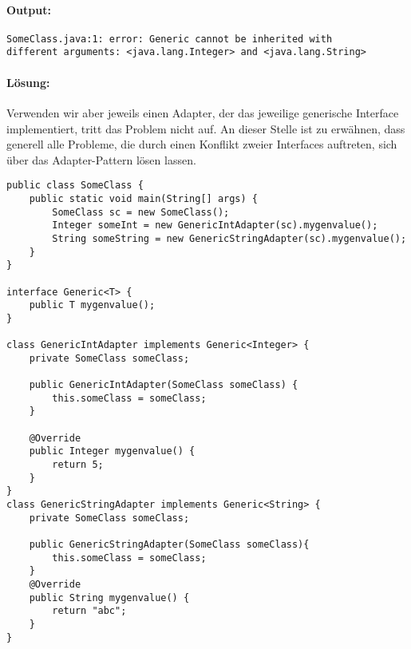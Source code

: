 \documentclass[a4paper, 1ppt]{article}
\begin{document}
\paragraph{Output:}
\begin{verbatim}
SomeClass.java:1: error: Generic cannot be inherited with
different arguments: <java.lang.Integer> and <java.lang.String>
\end{verbatim}
\newpage
\paragraph{Lösung:}
Verwenden wir aber jeweils einen Adapter, der das jeweilige generische Interface implementiert, tritt das Problem nicht auf.
An dieser Stelle ist zu erwähnen, dass generell alle Probleme, die durch einen Konflikt zweier Interfaces auftreten, sich über das Adapter-Pattern lösen lassen.
\begin{verbatim}
public class SomeClass {
    public static void main(String[] args) {
        SomeClass sc = new SomeClass();
        Integer someInt = new GenericIntAdapter(sc).mygenvalue();
        String someString = new GenericStringAdapter(sc).mygenvalue();
    }
}

interface Generic<T> {
    public T mygenvalue();
}

class GenericIntAdapter implements Generic<Integer> {
    private SomeClass someClass;

    public GenericIntAdapter(SomeClass someClass) {
        this.someClass = someClass;
    }

    @Override
    public Integer mygenvalue() {
        return 5;
    }
}
class GenericStringAdapter implements Generic<String> {
    private SomeClass someClass;

    public GenericStringAdapter(SomeClass someClass){
        this.someClass = someClass;
    }
    @Override
    public String mygenvalue() {
        return "abc";
    }
}
\end{verbatim}
\end{document}
